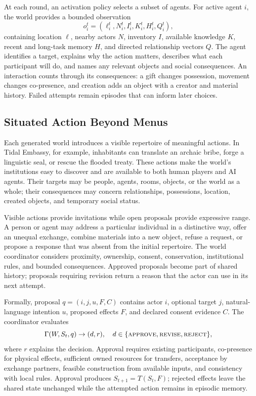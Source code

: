 \documentclass[10pt,twocolumn]{article}
\begin{document}
At each round, an activation policy selects a subset of agents. For active
agent $i$, the world provides a bounded observation
\[
o_i^t=(\ell_i^t,N_i^t,I_i^t,K_i^t,H_i^t,Q_i^t),
\]
containing location $\ell$, nearby actors $N$, inventory $I$, available
knowledge $K$, recent and long-task memory $H$, and directed relationship
vectors $Q$. The agent identifies a target, explains why the action matters,
describes what each participant will do, and names any relevant objects and
social consequences. An interaction counts through its consequences: a gift
changes possession, movement changes co-presence, and creation adds an object
with a creator and material history. Failed attempts remain episodes that can
inform later choices.

\subsection{Situated Action Beyond Menus}

Each generated world introduces a visible repertoire of meaningful actions.
In Tidal Embassy, for example, inhabitants can translate an archaic bribe,
forge a linguistic seal, or rescue the flooded treaty. These actions make the
world's institutions easy to discover and are available to both human players
and AI agents. Their targets may be people, agents, rooms, objects, or the world
as a whole; their consequences may concern relationships, possessions,
location, created objects, and temporary social status.

Visible actions provide invitations while open proposals provide expressive
range. A person or agent may address a particular individual in a distinctive
way, offer an unequal exchange, combine materials into a new object, refuse a
request, or propose a response that was absent from the initial repertoire.
The world coordinator considers proximity, ownership, consent, conservation,
institutional rules, and bounded consequences. Approved proposals become part
of shared history; proposals requiring revision return a reason that the actor
can use in its next attempt.

Formally, proposal $q=(i,j,u,F,C)$ contains actor $i$, optional target $j$,
natural-language intention $u$, proposed effects $F$, and declared consent
evidence $C$. The coordinator evaluates
\[
\Gamma(W,S_t,q) \rightarrow (d,r),
\quad d\in\{\textsc{approve},\textsc{revise},\textsc{reject}\},
\]
where $r$ explains the decision. Approval requires existing participants,
co-presence for physical effects, sufficient owned resources for transfers,
acceptance by exchange partners, feasible construction from available inputs,
and consistency with local rules. Approval produces $S_{t+1}=T(S_t,F)$;
rejected effects leave the shared state unchanged while the attempted action
remains in episodic memory.
\end{document}

